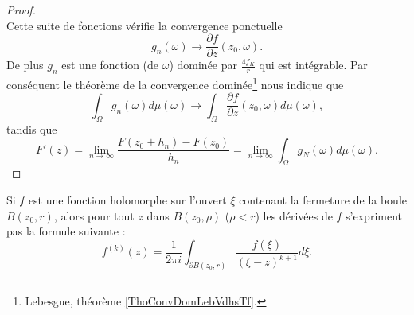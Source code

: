 \begin{proof}
\begin{equation}
	\end{equation}
	Cette suite de fonctions vérifie la convergence ponctuelle
	\begin{equation}
		g_n(\omega)\to\frac{ \partial f }{ \partial z }(z_0,\omega).
	\end{equation}
	De plus \( g_n\) est une fonction (de \( \omega\)) dominée par \( \frac{ 4f_K }{ r }\) qui est intégrable. Par conséquent le théorème de la convergence dominée\footnote{Lebesgue, théorème \ref{ThoConvDomLebVdhsTf}.} nous indique que
	\begin{equation}
		\int_{\Omega}g_n(\omega)d\mu(\omega)\to \int_{\Omega}\frac{ \partial f }{ \partial z }(z_0,\omega)d\mu(\omega),
	\end{equation}
	tandis que
	\begin{equation}
		F'(z)=\lim_{n\to \infty} \frac{ F(z_0+h_n)-F(z_0) }{ h_n }=\lim_{n\to \infty} \int_{\Omega}g_N(\omega)d\mu(\omega).
	\end{equation}
\end{proof}

\begin{corollary}       \label{CorNxTjEj}
	Si \( f\) est une fonction holomorphe sur l'ouvert \( \xi\) contenant la fermeture de la boule \( B(z_0,r)\), alors pour tout \( z\) dans \( B(z_0,\rho)\) (\( \rho<r\)) les dérivées de \( f\) s'expriment pas la formule suivante :
	\begin{equation}        \label{EQooBPIQooNhOTtB}
		f^{(k)}(z)=\frac{1}{ 2\pi i }\int_{\partial B(z_0,r)}\frac{ f(\xi) }{ (\xi-z)^{k+1} }d\xi.
	\end{equation}
\end{corollary}

